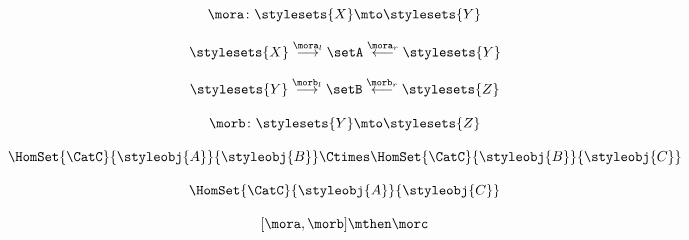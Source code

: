 {\begin{forslides}
    \begin{equation}
        \label{eq:slides_multicategories_76}
        \mora \colon \stylesets{X}  \mto \stylesets{Y}
    \end{equation}

    \begin{equation}
        \label{eq:slides_multicategories_77}
        \stylesets{X} \overset{\mora_l}{\longrightarrow} \setA \overset{\mora_r}{\longleftarrow} \stylesets{Y}
    \end{equation}

    \begin{equation}
        \label{eq:slides_multicategories_78}
        \stylesets{Y} \overset{\morb_l}{\longrightarrow} \setB \overset{\morb_r}{\longleftarrow} \stylesets{Z}
    \end{equation}

    \begin{equation}
        \label{eq:slides_multicategories_79}
        \morb \colon \stylesets{Y}  \mto \stylesets{Z}
    \end{equation}

    \begin{equation}
        \label{eq:slides_multicategories_80}
        \HomSet{\CatC}{\styleobj{A}}{\styleobj{B}} \Ctimes \HomSet{\CatC}{\styleobj{B}}{\styleobj{C}}
    \end{equation}

    \begin{equation}
        \label{eq:slides_multicategories_81}
        \HomSet{\CatC}{\styleobj{A}}{\styleobj{C}}
    \end{equation}

    \begin{equation}
        \label{eq:composition_operad}
        [\mora,\morb]\mthen \morc
    \end{equation}

\end{forslides}

}